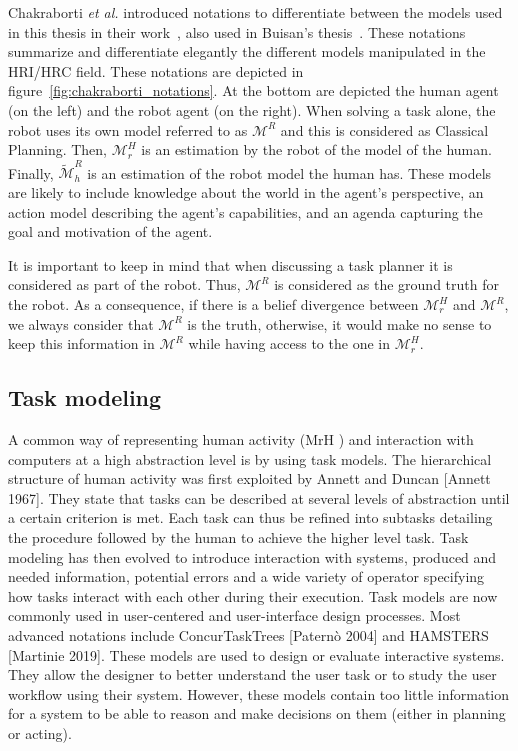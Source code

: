 Chakraborti \textit{et al.} introduced notations to differentiate between the models used in this thesis in their work~\cite{ChakrabortiBTZS15}, also used in Buisan's thesis~\cite{thesisBuisan21}. These notations summarize and differentiate elegantly the different models manipulated in the HRI/HRC field. These notations are depicted in figure~\ref{fig:chakraborti_notations}. At the bottom are depicted the human agent (on the left) and the robot agent (on the right). When solving a task alone, the robot uses its own model referred to as $\mathcal{M}^R$ and this is considered as Classical Planning. 
Then, $\mathcal{M}^H_r$ is an estimation by the robot of the model of the human. Finally, $\tilde{\mathcal{M}}^R_h$ is an estimation of the robot model the human has. These models are likely to include knowledge about the world in the agent's perspective, an action model describing the agent's capabilities, and an agenda capturing the goal and motivation of the agent.

It is important to keep in mind that when discussing a task planner it is considered as part of the robot. Thus, $\mathcal{M}^R$ is considered as the ground truth for the robot. As a consequence, if there is a belief divergence between $\mathcal{M}^H_r$ and $\mathcal{M}^R$, we always consider that $\mathcal{M}^R$ is the truth, otherwise, it would make no sense to keep this information in $\mathcal{M}^R$ while having access to the one in $\mathcal{M}^H_r$.

\subsection{Task modeling}

A common way of representing human activity (MrH ) and interaction with computers at a high abstraction level is by using task models. The hierarchical structure of human activity was first exploited by Annett and Duncan [Annett 1967]. They state that tasks can be described at several levels of abstraction until a certain criterion is met. Each task can thus be refined into subtasks detailing the procedure followed by the human to achieve the higher level task. Task modeling has then evolved to introduce interaction with systems, produced and needed information, potential errors and a wide variety of operator specifying how tasks interact with each other during their execution. Task models are now commonly used in user-centered and user-interface design processes. Most advanced notations include ConcurTaskTrees [Paternò 2004] and HAMSTERS [Martinie 2019]. These models are used to design or evaluate interactive systems. They allow the designer to better understand the user task or to study the user workflow using their system. However, these models contain too little information for a system to be able to reason and make decisions on them (either in planning or acting).


